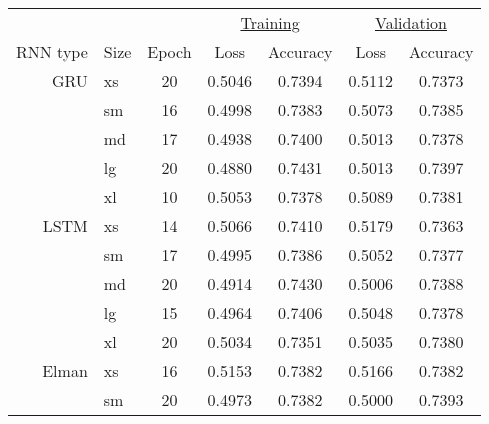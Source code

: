 \begin{table}
	\begin{tabular}{r l  ccccc}
		         &      &       & \multicolumn{2}{c}{\underline{Training}} & \multicolumn{2}{c}{\underline{Validation}}                     \\
		RNN type & Size & Epoch & Loss                                     & Accuracy                                   & Loss   & Accuracy \\
		\hline
		GRU      & xs   & 20    & 0.5046                                   & 0.7394                                     & 0.5112 & 0.7373   \\
		         & sm   & 16    & 0.4998                                   & 0.7383                                     & 0.5073 & 0.7385   \\
		         & md   & 17    & 0.4938                                   & 0.7400                                     & 0.5013 & 0.7378   \\
		         & lg   & 20    & 0.4880                                   & 0.7431                                     & 0.5013 & 0.7397   \\
		         & xl   & 10    & 0.5053                                   & 0.7378                                     & 0.5089 & 0.7381   \\
		\hline
		LSTM     & xs   & 14    & 0.5066                                   & 0.7410                                     & 0.5179 & 0.7363   \\
		         & sm   & 17    & 0.4995                                   & 0.7386                                     & 0.5052 & 0.7377   \\
		         & md   & 20    & 0.4914                                   & 0.7430                                     & 0.5006 & 0.7388   \\
		         & lg   & 15    & 0.4964                                   & 0.7406                                     & 0.5048 & 0.7378   \\
		         & xl   & 20    & 0.5034                                   & 0.7351                                     & 0.5035 & 0.7380   \\
		\hline
		Elman    & xs   & 16    & 0.5153                                   & 0.7382                                     & 0.5166 & 0.7382   \\
		         & sm   & 20    & 0.4973                                   & 0.7382                                     & 0.5000 & 0.7393   \\

\end{tabular}
\end{table}
